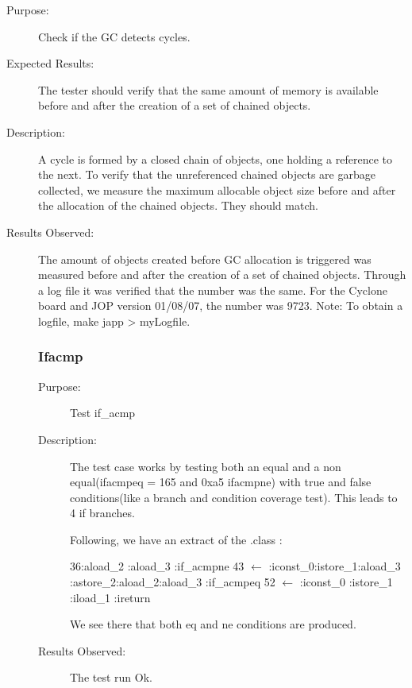 \begin{description}
    \item[Purpose:]
Check if the GC detects cycles.
    \item[Expected Results:]
The tester should verify that the same amount of memory is available
before and after the creation of a set of chained objects.
    \item[Description:]
A cycle is formed by a closed chain of objects, one holding a
reference to the next. To verify that the unreferenced chained
objects are garbage collected, we measure the maximum allocable
object size before and after the allocation of the chained objects.
They should match.
    \item[Results Observed:]
The amount of objects created before GC allocation is triggered was
measured before and after the creation of a set of chained objects.
Through a log file it was verified that the number was the same. For
the Cyclone board and JOP version 01/08/07, the number was 9723.
Note: To obtain a logfile, make japp > myLogfile.

\subsubsection{Ifacmp}
\begin{description}
   \item[Purpose:]
Test if\_acmp
   \item[Description:]
The test case works by testing both an equal and a non
equal(ifacmpeq = 165 and 0xa5 ifacmpne) with true and false
conditions(like a branch and condition coverage test). This leads to
4 if branches.

Following, we have an extract of the .class :

36:aload\_2 :aload\_3 :if\_acmpne       43 $
\longleftarrow $ :iconst\_0:istore\_1:aload\_3 :astore\_2:aload\_2:aload\_3        :if\_acmpeq       52 $ \longleftarrow
$ :iconst\_0        :istore\_1        :iload\_1         :ireturn         \newline

We see there that both eq and ne conditions are produced.
   \item[Results Observed:]
The test run Ok.
\end{description}

\end{description}
